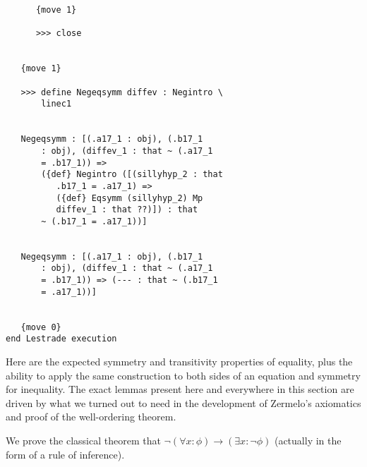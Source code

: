 \documentclass[12pt]{article}
\begin{document}
\begin{verbatim}
      {move 1}

      >>> close


   {move 1}

   >>> define Negeqsymm diffev : Negintro \
       linec1


   Negeqsymm : [(.a17_1 : obj), (.b17_1 
       : obj), (diffev_1 : that ~ (.a17_1 
       = .b17_1)) => 
       ({def} Negintro ([(sillyhyp_2 : that 
          .b17_1 = .a17_1) => 
          ({def} Eqsymm (sillyhyp_2) Mp 
          diffev_1 : that ??)]) : that 
       ~ (.b17_1 = .a17_1))]


   Negeqsymm : [(.a17_1 : obj), (.b17_1 
       : obj), (diffev_1 : that ~ (.a17_1 
       = .b17_1)) => (--- : that ~ (.b17_1 
       = .a17_1))]


   {move 0}
end Lestrade execution
\end{verbatim}

Here are the expected symmetry and transitivity properties of equality, plus the ability to apply the same construction to both sides of an equation and symmetry for inequality.  The exact lemmas present here and everywhere in this section are driven by what we turned out to need in the development of Zermelo's axiomatics and proof of the well-ordering theorem.





We prove the classical theorem that $\neg (\forall x:\phi) \rightarrow (\exists x:\neg\phi)$ (actually in the form of a rule of inference).
\end{document}
